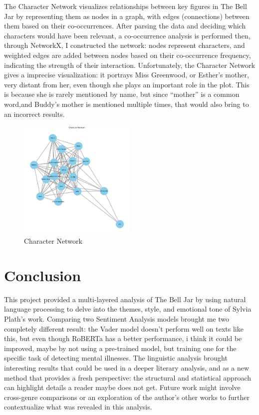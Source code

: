 \documentclass[11pt]{article}
\begin{document}
The Character Network visualizes relationships between key figures in The Bell Jar by representing them as nodes in a graph, with edges (connections) between them based on their co-occurrences. After parsing the data and deciding which characters would have been relevant, a co-occurrence analysis is performed then, through NetworkX, I constructed the network: nodes represent characters, and weighted edges are added between nodes based on their co-occurrence frequency, indicating the strength of their interaction.
Unfortunately, the Character Network gives a imprecise visualization: it portrays Miss Greenwood, or Esther’s mother, very distant from her, even though she plays an important role in the plot. This is because she is rarely mentioned by name, but since “mother” is a common word,and Buddy's mother is mentioned multiple times, that would also bring to an incorrect results.

\begin{figure}[h]
    \centering
    \includegraphics[width=0.5\textwidth]{graph/charanet.png}
    \caption{Character Network}
    \label{fig:example}
\end{figure}

\section{Conclusion}
This project provided a multi-layered analysis of The Bell Jar by using natural language processing to delve into the themes, style, and emotional tone of Sylvia Plath's work. 
Comparing two Sentiment Analysis models brought me two completely different result: the Vader model doesn’t perform well on texts like this, but even though RoBERTa has a better performance, i think it could be improved, maybe by not using a pre-trained model, but training one for the specific task of detecting mental illnesses.
The linguistic analysis brought interesting results that could be used in a deeper literary analysis, and as a new method that provides a fresh perspective: the structural and statistical approach can highlight details a reader maybe does not get. Future work might involve cross-genre comparisons or an exploration of the author’s other works to further contextualize what was revealed in this analysis.
\end{document}
